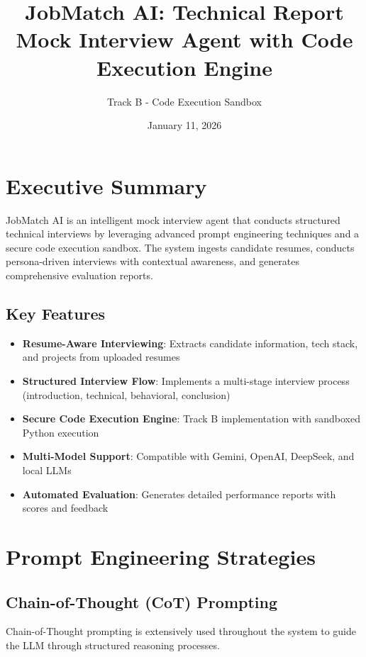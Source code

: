 \documentclass[12pt,a4paper]{article}
\title{\textbf{JobMatch AI: Technical Report} \\ 
\large Mock Interview Agent with Code Execution Engine}
\author{Track B - Code Execution Sandbox}
\date{January 11, 2026}
\begin{document}
\maketitle
\tableofcontents
\newpage

\section{Executive Summary}

JobMatch AI is an intelligent mock interview agent that conducts structured technical interviews by leveraging advanced prompt engineering techniques and a secure code execution sandbox. The system ingests candidate resumes, conducts persona-driven interviews with contextual awareness, and generates comprehensive evaluation reports.

\subsection{Key Features}
\begin{itemize}
    \item \textbf{Resume-Aware Interviewing}: Extracts candidate information, tech stack, and projects from uploaded resumes
    \item \textbf{Structured Interview Flow}: Implements a multi-stage interview process (introduction, technical, behavioral, conclusion)
    \item \textbf{Secure Code Execution Engine}: Track B implementation with sandboxed Python execution
    \item \textbf{Multi-Model Support}: Compatible with Gemini, OpenAI, DeepSeek, and local LLMs
    \item \textbf{Automated Evaluation}: Generates detailed performance reports with scores and feedback
\end{itemize}

\section{Prompt Engineering Strategies}

\subsection{Chain-of-Thought (CoT) Prompting}

Chain-of-Thought prompting is extensively used throughout the system to guide the LLM through structured reasoning processes.
\end{document}
